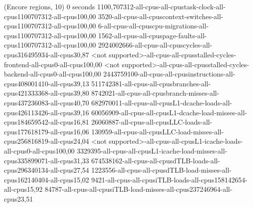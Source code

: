 (Encore regions, 10)
0 seconds
1100,707312-all-cpus-all-cpustask-clock-all-cpus1100707312-all-cpus100,00
3520-all-cpus-all-cpuscontext-switches-all-cpus1100707312-all-cpus100,00
6-all-cpus-all-cpuscpu-migrations-all-cpus1100707312-all-cpus100,00
1562-all-cpus-all-cpuspage-faults-all-cpus1100707312-all-cpus100,00
2924002666-all-cpus-all-cpuscycles-all-cpus316495934-all-cpus30,87
<not supported>-all-cpus-all-cpusstalled-cycles-frontend-all-cpus0-all-cpus100,00
<not supported>-all-cpus-all-cpusstalled-cycles-backend-all-cpus0-all-cpus100,00
2443759100-all-cpus-all-cpusinstructions-all-cpus408001410-all-cpus39,13
511742381-all-cpus-all-cpusbranches-all-cpus421333368-all-cpus39,80
8742021-all-cpus-all-cpusbranch-misses-all-cpus437236083-all-cpus40,70
682970011-all-cpus-all-cpusL1-dcache-loads-all-cpus426113426-all-cpus39,16
60056909-all-cpus-all-cpusL1-dcache-load-misses-all-cpus184659542-all-cpus16,81
26060887-all-cpus-all-cpusLLC-loads-all-cpus177618179-all-cpus16,06
130959-all-cpus-all-cpusLLC-load-misses-all-cpus256816819-all-cpus24,04
<not supported>-all-cpus-all-cpusL1-icache-loads-all-cpus0-all-cpus100,00
3329395-all-cpus-all-cpusL1-icache-load-misses-all-cpus335899071-all-cpus31,33
674538162-all-cpus-all-cpusdTLB-loads-all-cpus296340134-all-cpus27,54
1223556-all-cpus-all-cpusdTLB-load-misses-all-cpus162140404-all-cpus15,02
9421-all-cpus-all-cpusiTLB-loads-all-cpus158142654-all-cpus15,92
84787-all-cpus-all-cpusiTLB-load-misses-all-cpus237246964-all-cpus23,51
